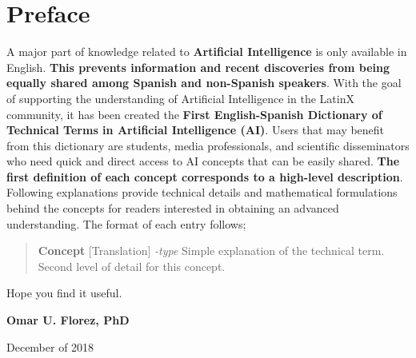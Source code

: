 \documentclass[twoside]{book}
\begin{document}
\chapter{Preface}
\begin{flushleft}
A major part of knowledge related to \textbf{Artificial Intelligence} is only available in English. \textbf{This prevents information and recent discoveries from being equally shared among Spanish and non-Spanish speakers}. 
\linebreak \linebreak 
With the goal of supporting the understanding of Artificial Intelligence in the LatinX community, it has been created the \textbf{First English-Spanish Dictionary of Technical Terms in Artificial Intelligence (AI)}.  
Users that may benefit from this dictionary are students, media professionals, and scientific disseminators who need quick and direct access to AI concepts that can be easily shared.
\linebreak \linebreak 
\textbf{The first definition of each concept corresponds to a high-level description}. Following explanations provide technical details and mathematical formulations behind the concepts for readers interested in obtaining an advanced understanding. The format of each entry follows;

\begin{verse}
\textbf{Concept} [Translation] \textit{-type} Simple explanation of the technical term. Second level of detail for this concept.
\end{verse}

Hope you find it useful.\bigskip 

\textbf{Omar U. Florez, PhD}

December of 2018
\end{flushleft}

\let\cleardoublepage\clearpage
\end{document}
